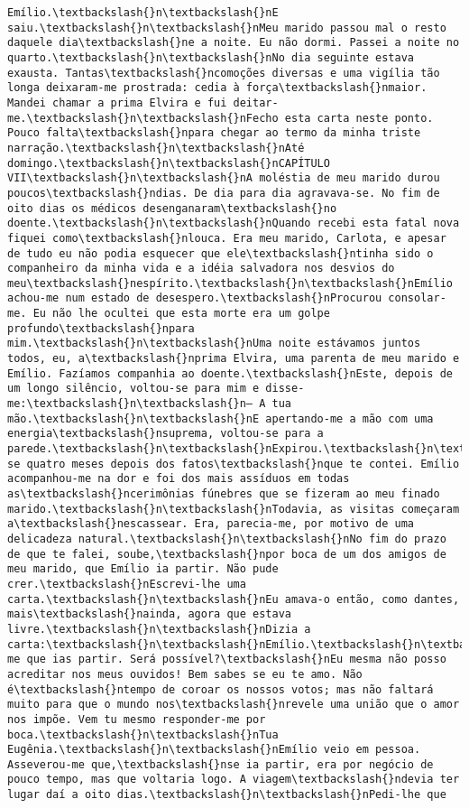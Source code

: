 \begin{Verbatim}[commandchars=\\\{\}]
Emílio.\textbackslash{}n\textbackslash{}nE saiu.\textbackslash{}n\textbackslash{}nMeu marido passou mal o resto daquele dia\textbackslash{}ne a noite. Eu não dormi. Passei a noite no quarto.\textbackslash{}n\textbackslash{}nNo dia seguinte estava exausta. Tantas\textbackslash{}ncomoções diversas e uma vigília tão longa deixaram-me prostrada: cedia à força\textbackslash{}nmaior. Mandei chamar a prima Elvira e fui deitar-me.\textbackslash{}n\textbackslash{}nFecho esta carta neste ponto. Pouco falta\textbackslash{}npara chegar ao termo da minha triste narração.\textbackslash{}n\textbackslash{}nAté domingo.\textbackslash{}n\textbackslash{}nCAPÍTULO VII\textbackslash{}n\textbackslash{}nA moléstia de meu marido durou poucos\textbackslash{}ndias. De dia para dia agravava-se. No fim de oito dias os médicos desenganaram\textbackslash{}no doente.\textbackslash{}n\textbackslash{}nQuando recebi esta fatal nova fiquei como\textbackslash{}nlouca. Era meu marido, Carlota, e apesar de tudo eu não podia esquecer que ele\textbackslash{}ntinha sido o companheiro da minha vida e a idéia salvadora nos desvios do meu\textbackslash{}nespírito.\textbackslash{}n\textbackslash{}nEmílio achou-me num estado de desespero.\textbackslash{}nProcurou consolar-me. Eu não lhe ocultei que esta morte era um golpe profundo\textbackslash{}npara mim.\textbackslash{}n\textbackslash{}nUma noite estávamos juntos todos, eu, a\textbackslash{}nprima Elvira, uma parenta de meu marido e Emílio. Fazíamos companhia ao doente.\textbackslash{}nEste, depois de um longo silêncio, voltou-se para mim e disse-me:\textbackslash{}n\textbackslash{}n— A tua mão.\textbackslash{}n\textbackslash{}nE apertando-me a mão com uma energia\textbackslash{}nsuprema, voltou-se para a parede.\textbackslash{}n\textbackslash{}nExpirou.\textbackslash{}n\textbackslash{}n{\ldots}\textbackslash{}n\textbackslash{}nPassaram-se quatro meses depois dos fatos\textbackslash{}nque te contei. Emílio acompanhou-me na dor e foi dos mais assíduos em todas as\textbackslash{}ncerimônias fúnebres que se fizeram ao meu finado marido.\textbackslash{}n\textbackslash{}nTodavia, as visitas começaram a\textbackslash{}nescassear. Era, parecia-me, por motivo de uma delicadeza natural.\textbackslash{}n\textbackslash{}nNo fim do prazo de que te falei, soube,\textbackslash{}npor boca de um dos amigos de meu marido, que Emílio ia partir. Não pude crer.\textbackslash{}nEscrevi-lhe uma carta.\textbackslash{}n\textbackslash{}nEu amava-o então, como dantes, mais\textbackslash{}nainda, agora que estava livre.\textbackslash{}n\textbackslash{}nDizia a carta:\textbackslash{}n\textbackslash{}nEmílio.\textbackslash{}n\textbackslash{}nConstou-me que ias partir. Será possível?\textbackslash{}nEu mesma não posso acreditar nos meus ouvidos! Bem sabes se eu te amo. Não é\textbackslash{}ntempo de coroar os nossos votos; mas não faltará muito para que o mundo nos\textbackslash{}nrevele uma união que o amor nos impõe. Vem tu mesmo responder-me por boca.\textbackslash{}n\textbackslash{}nTua Eugênia.\textbackslash{}n\textbackslash{}nEmílio veio em pessoa. Asseverou-me que,\textbackslash{}nse ia partir, era por negócio de pouco tempo, mas que voltaria logo. A viagem\textbackslash{}ndevia ter lugar daí a oito dias.\textbackslash{}n\textbackslash{}nPedi-lhe que 
\end{Verbatim}
